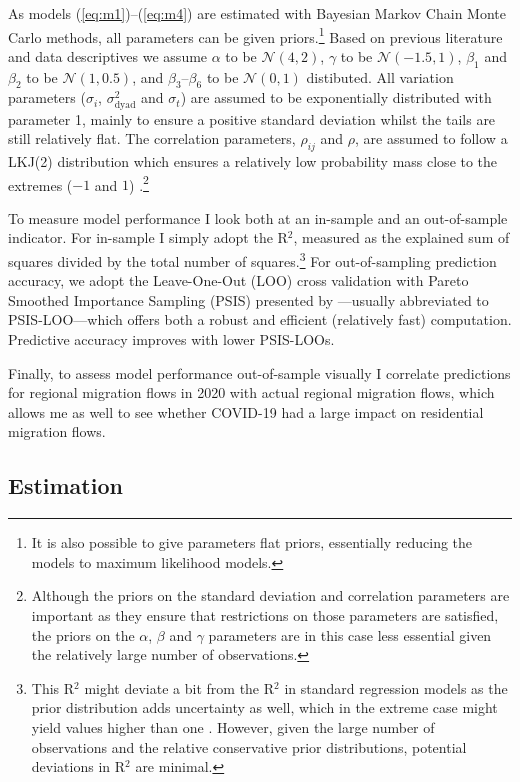 \documentclass[11pt,parskip,abstracton,notitlepage, dvipsnames]{scrartcl}
\begin{document}
As models (\ref{eq:m1})--(\ref{eq:m4}) are estimated with Bayesian Markov Chain Monte Carlo methods, all parameters can be given priors.\footnote{It is also possible to give parameters flat priors, essentially reducing the models to maximum likelihood models.} Based on previous literature and data descriptives we assume $\alpha$ to be $\mathcal{N}(4,2)$, $\gamma$ to be $\mathcal{N}(-1.5,1)$, $\beta_1$ and $\beta_2$ to be $\mathcal{N}(1, 0.5)$, and $\beta_3$--$\beta_6$ to be $\mathcal{N}(0,1)$ distibuted. All variation parameters ($\sigma_i$, $\sigma^2_{\text{dyad}}$ and $\sigma_t$) are assumed to be exponentially distributed with parameter 1, mainly to ensure a positive standard deviation whilst the tails are still relatively flat. The correlation parameters, $\rho_{ij}$ and $\rho$, are assumed to follow a LKJ(2) distribution which ensures a relatively low probability mass close to the extremes ($-1$ and $1$) \citep{lewandowski2009generating}.\footnote{Although the priors on the standard deviation and correlation parameters are important as they ensure that restrictions on those parameters are satisfied, the priors on the $\alpha$, $\beta$ and $\gamma$ parameters are in this case less essential given the relatively large number of observations.}

To measure model performance I look both at an in-sample and an out-of-sample indicator. For in-sample I simply adopt the R$^2$, measured as the explained sum of squares divided by the total number of squares.\footnote{This R$^{2}$ might deviate a bit from the R$^2$ in standard regression models as the prior distribution adds uncertainty as well, which in the extreme case might yield values higher than one \citep{gelman2019r}. However, given the large number of observations and the relative conservative prior distributions, potential deviations in R$^2$ are minimal.} For out-of-sampling prediction accuracy, we adopt the Leave-One-Out (LOO) cross validation with Pareto Smoothed Importance Sampling (PSIS) presented by \citet{vehtari2017practical}---usually abbreviated to PSIS-LOO---which offers both a robust and efficient (relatively fast) computation. Predictive accuracy improves with lower PSIS-LOOs.

Finally, to assess model performance out-of-sample visually I correlate predictions for regional migration flows in 2020 with actual regional migration flows, which allows me as well to see whether COVID-19 had a large impact on residential migration flows. 

\subsection{Estimation}
\end{document}
